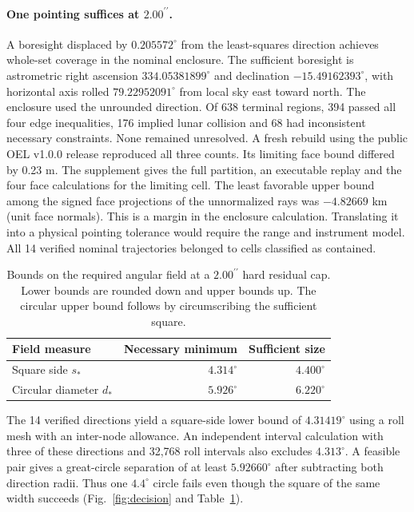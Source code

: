 \documentclass[10pt,letterpaper]{article}
\newcommand{\degc}{^{\circ}}
\newcommand{\as}{^{\prime\prime}}
\begin{document}
\paragraph{One pointing suffices at $2.00\as$.}
A boresight displaced by $0.205572\degc$ from the least-squares direction achieves whole-set coverage in the nominal enclosure.
The sufficient boresight is astrometric right ascension $334.05381899\degc$ and declination $-15.49162393\degc$, with horizontal axis rolled $79.22952091\degc$ from local sky east toward north. The enclosure used the unrounded direction. Of 638 terminal regions, 394 passed all four edge inequalities, 176 implied lunar collision and 68 had inconsistent necessary constraints. None remained unresolved. A fresh rebuild using the public OEL v1.0.0 release reproduced all three counts. Its limiting face bound differed by 0.23 m. The supplement gives the full partition, an executable replay and the four face calculations for the limiting cell. The least favorable upper bound among the signed face projections of the unnormalized rays was $-4.82669$ km (unit face normals). This is a margin in the enclosure calculation. Translating it into a physical pointing tolerance would require the range and instrument model. All 14 verified nominal trajectories belonged to cells classified as contained.

\begin{table}[htbp]
\centering
\caption{Bounds on the required angular field at a $2.00\as$ hard residual cap. Lower bounds are rounded down and upper bounds up. The circular upper bound follows by circumscribing the sufficient square.}
\label{tab:bounds}
\begin{tabular}{lrr}
\toprule
Field measure & Necessary minimum & Sufficient size\\
\midrule
Square side $s_*$ & $4.314\degc$ & $4.400\degc$\\
Circular diameter $d_*$ & $5.926\degc$ & $6.220\degc$\\
\bottomrule
\end{tabular}
\end{table}

The 14 verified directions yield a square-side lower bound of $4.31419\degc$ using a roll mesh with an inter-node allowance. An independent interval calculation with three of these directions and 32,768 roll intervals also excludes $4.313\degc$. A feasible pair gives a great-circle separation of at least $5.92660\degc$ after subtracting both direction radii. Thus one $4.4\degc$ circle fails even though the square of the same width succeeds (Fig.~\ref{fig:decision} and Table~\ref{tab:bounds}).
\end{document}
